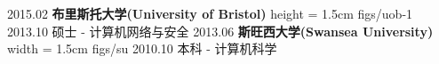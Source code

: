 %
%
%
%
%
%
\begin{educations}
	\education
    {2015.02}			{\textbf{布里斯托大学(University of Bristol)}}
    {height = 1.5cm}			{figs/uob-1}
    {2013.10}		{硕士 - 计算机网络与安全 }
    {} {}
  \universitySeparator
    \education
	  {2013.06}			{\textbf{斯旺西大学(Swansea University)}}
	  {width = 1.5cm}			{figs/su}
	  {2010.10}		{本科 - 计算机科学}
	  {} {}
\end{educations}
